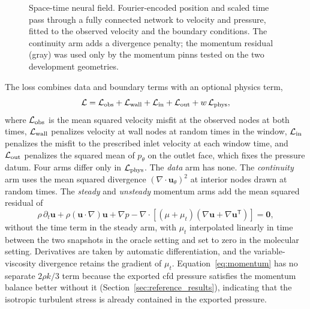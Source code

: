 \documentclass[12pt,a4paper]{article}
\newcommand{\CFD}{\ac{cfd}\xspace}
\newcommand{\PINNs}{\acp{pinn}\xspace}
\theoremstyle{definition}
\numberwithin{equation}{section}
\begin{document}
\begin{figure}[!t]
{%
  }
  \caption{Space-time neural field. Fourier-encoded position and scaled time pass through a fully connected network to velocity and pressure, fitted to the observed velocity and the boundary conditions. The continuity arm adds a divergence penalty; the momentum residual (gray) was used only by the momentum \PINNs tested on the two development geometries.}
  \label{fig:network}
\end{figure}


The loss combines data and boundary terms with an optional physics term,
\begin{equation}
\mathcal L=\mathcal L_{\rm obs}+\mathcal L_{\rm wall}+\mathcal L_{\rm in}+\mathcal L_{\rm out}+w\,\mathcal L_{\rm phys},
\label{eq:loss}
\end{equation}
where $\mathcal L_{\rm obs}$ is the mean squared velocity misfit at the observed nodes at both times, $\mathcal L_{\rm wall}$ penalizes velocity at wall nodes at random times in the window, $\mathcal L_{\rm in}$ penalizes the misfit to the prescribed inlet velocity at each window time, and $\mathcal L_{\rm out}$ penalizes the squared mean of $p_\theta$ on the outlet face, which fixes the pressure datum. Four arms differ only in $\mathcal L_{\rm phys}$. The \emph{data} arm has none. The \emph{continuity} arm uses the mean squared divergence $(\nabla\cdot\mathbf u_\theta)^2$ at interior nodes drawn at random times. The \emph{steady} and \emph{unsteady} momentum arms add the mean squared residual of
\begin{equation}
\rho\,\partial_t\mathbf u+\rho(\mathbf u\cdot\nabla)\mathbf u
+\nabla p-\nabla\cdot\left[(\mu+\mu_t)
(\nabla\mathbf u+\nabla\mathbf u^{\mathsf T})\right]=\mathbf 0,
\label{eq:momentum}
\end{equation}
without the time term in the steady arm, with $\mu_t$ interpolated linearly in time between the two snapshots in the oracle setting and set to zero in the molecular setting. Derivatives are taken by automatic differentiation, and the variable-viscosity divergence retains the gradient of $\mu_t$. Equation~\eqref{eq:momentum} has no separate $2\rho k/3$ term because the exported \CFD pressure satisfies the momentum balance better without it (Section~\ref{sec:reference_results}), indicating that the isotropic turbulent stress is already contained in the exported pressure.
\end{document}
